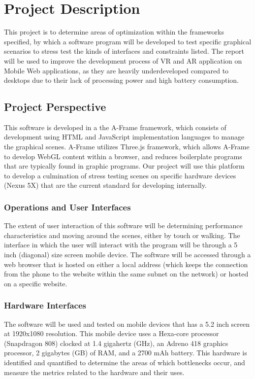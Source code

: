 \documentclass[letterpaper,10pt,draftclsnofoot,onecolumn,compsoc]{IEEEtran}
\begin{document}
\section{Project Description}
\begin{singlespace}
\noindent
This project is to determine areas of optimization within the frameworks specified, by which a software program will be developed to test specific graphical scenarios to stress test the kinds of interfaces and constraints listed. The report will be used to improve the development process of VR and AR application on Mobile Web applications, as they are heavily underdeveloped compared to desktops due to their lack of processing power and high battery consumption.

\subsection{Project Perspective}
\begin{singlespace}
\noindent
This software is developed in a the A-Frame framework, which consists of development using HTML and JavaScript implementation languages to manage the graphical scenes. A-Frame utilizes Three.js framework, which allows A-Frame to develop WebGL content within a browser, and reduces boilerplate programs that are  typically found in graphic programs. Our project will  use this platform to develop a culmination of stress testing scenes on specific hardware devices (Nexus 5X) that are the current standard for developing internally.
\end{singlespace}

\subsubsection{Operations and User Interfaces}
\begin{singlespace}
\noindent
The extent of user interaction of this software will be determining performance characteristics and moving around the scenes, either by touch or walking. The interface in which the user will interact with the program will be through a 5 inch (diagonal) size screen mobile device. The software will be accessed through a web browser that is hosted on either a local address (which keeps the connection from the phone to the website within the same subnet on the network) or hosted on a specific website.
\end{singlespace}

\subsubsection{Hardware Interfaces}
\begin{singlespace}
\noindent
The software will be used and tested on mobile devices that has a 5.2 inch screen at 1920x1080 resolution. This mobile device uses a Hexa-core processor (Snapdragon 808) clocked at 1.4 gigahertz (GHz), an Adreno 418 graphics processor, 2 gigabytes (GB) of RAM, and a 2700 mAh battery. This hardware is identified and quantified to determine the areas of which bottlenecks occur, and measure the metrics related to the hardware and their uses.
\end{singlespace}


\end{singlespace}
\end{document}
